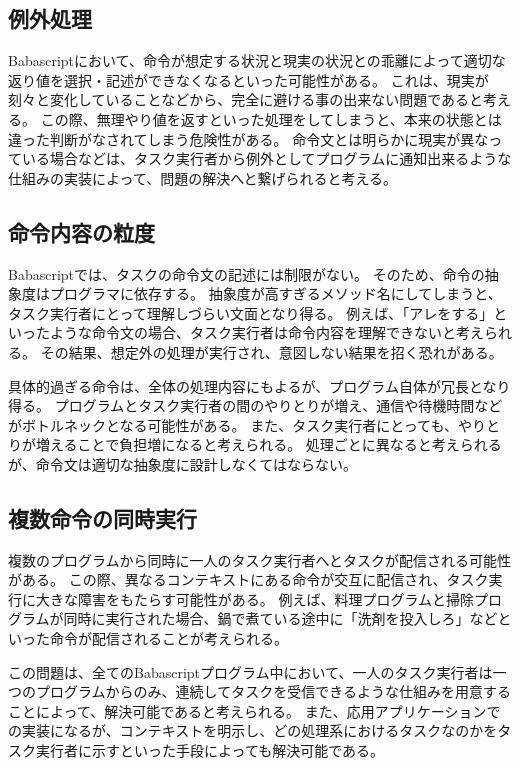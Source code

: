 \documentclass[twoside]{wiss}
\begin{document}
\subsection{例外処理}

Babascriptにおいて、命令が想定する状況と現実の状況との乖離によって適切な返り値を選択・記述ができなくなるといった可能性がある。
これは、現実が刻々と変化していることなどから、完全に避ける事の出来ない問題であると考える。
この際、無理やり値を返すといった処理をしてしまうと、本来の状態とは違った判断がなされてしまう危険性がある。
命令文とは明らかに現実が異なっている場合などは、タスク実行者から例外としてプログラムに通知出来るような仕組みの実装によって、問題の解決へと繋げられると考える。

\subsection{命令内容の粒度}

Babascriptでは、タスクの命令文の記述には制限がない。
そのため、命令の抽象度はプログラマに依存する。
抽象度が高すぎるメソッド名にしてしまうと、タスク実行者にとって理解しづらい文面となり得る。
例えば、「アレをする」といったような命令文の場合、タスク実行者は命令内容を理解できないと考えられる。
その結果、想定外の処理が実行され、意図しない結果を招く恐れがある。

具体的過ぎる命令は、全体の処理内容にもよるが、プログラム自体が冗長となり得る。
プログラムとタスク実行者の間のやりとりが増え、通信や待機時間などがボトルネックとなる可能性がある。
また、タスク実行者にとっても、やりとりが増えることで負担増になると考えられる。
処理ごとに異なると考えられるが、命令文は適切な抽象度に設計しなくてはならない。


\subsection{複数命令の同時実行}

複数のプログラムから同時に一人のタスク実行者へとタスクが配信される可能性がある。
この際、異なるコンテキストにある命令が交互に配信され、タスク実行に大きな障害をもたらす可能性がある。
例えば、料理プログラムと掃除プログラムが同時に実行された場合、鍋で煮ている途中に「洗剤を投入しろ」などといった命令が配信されることが考えられる。

この問題は、全てのBabascriptプログラム中において、一人のタスク実行者は一つのプログラムからのみ、連続してタスクを受信できるような仕組みを用意することによって、解決可能であると考えられる。
また、応用アプリケーションでの実装になるが、コンテキストを明示し、どの処理系におけるタスクなのかをタスク実行者に示すといった手段によっても解決可能である。
\end{document}
